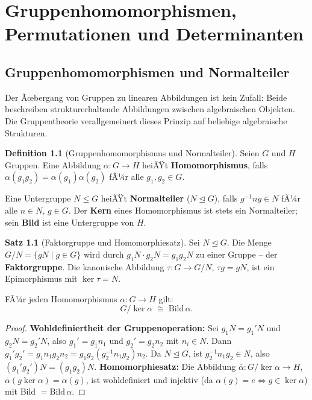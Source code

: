 ﻿\documentclass[a4paper,12pt]{report}
\theoremstyle{definition}
\newtheorem{definition}{Definition}
\newtheorem{satz}{Satz}
\begin{document}
\chapter{Gruppenhomomorphismen, Permutationen und Determinanten}

\section{Gruppenhomomorphismen und Normalteiler}

Der Ãœbergang von Gruppen zu linearen Abbildungen ist kein Zufall:
Beide beschreiben strukturerhaltende Abbildungen zwischen algebraischen
Objekten. Die Gruppentheorie verallgemeinert dieses Prinzip auf
beliebige algebraische Strukturen.

\begin{definition}[Gruppenhomomorphismus und Normalteiler]
    Seien $G$ und $H$ Gruppen. Eine Abbildung $\alpha : G \to H$ heiÃŸt
    \textbf{Homomorphismus}, falls $\alpha(g_1 g_2) = \alpha(g_1)\alpha(g_2)$
    fÃ¼r alle $g_1, g_2 \in G$.

    Eine Untergruppe $N \leq G$ heiÃŸt \textbf{Normalteiler} ($N \trianglelefteq G$),
    falls $g^{-1}ng \in N$ fÃ¼r alle $n \in N$, $g \in G$. Der \textbf{Kern} eines
    Homomorphismus ist stets ein Normalteiler; sein \textbf{Bild} ist eine
    Untergruppe von $H$.
\end{definition}

\begin{satz}[Faktorgruppe und Homomorphiesatz]
    Sei $N \trianglelefteq G$. Die Menge $G/N = \{gN \mid g \in G\}$ wird
    durch $g_1 N \cdot g_2 N = g_1 g_2 N$ zu einer Gruppe -- der
    \textbf{Faktorgruppe}. Die kanonische Abbildung $\tau : G \to G/N$,
    $\tau g = gN$, ist ein Epimorphismus mit $\ker \tau = N$.

    FÃ¼r jeden Homomorphismus $\alpha : G \to H$ gilt:
    \[
        G / \ker \alpha \;\cong\; \mathrm{Bild}\, \alpha.
    \]
\end{satz}
\begin{proof}
    \textbf{Wohldefiniertheit der Gruppenoperation:} Sei $g_1 N = g_1' N$ und
    $g_2 N = g_2' N$, also $g_1' = g_1 n_1$ und $g_2' = g_2 n_2$ mit $n_i \in N$.
    Dann $g_1' g_2' = g_1 n_1 g_2 n_2 = g_1 g_2 (g_2^{-1} n_1 g_2) n_2$.
    Da $N \trianglelefteq G$, ist $g_2^{-1} n_1 g_2 \in N$, also
    $(g_1' g_2') N = (g_1 g_2) N$.
    \textbf{Homomorphiesatz:} Die Abbildung $\bar{\alpha} : G/\ker\alpha \to H$,
    $\bar{\alpha}(g \ker\alpha) = \alpha(g)$, ist wohldefiniert und injektiv
    (da $\alpha(g) = e \Leftrightarrow g \in \ker\alpha$) mit Bild $= \mathrm{Bild}\,\alpha$.
\end{proof}
\end{document}
